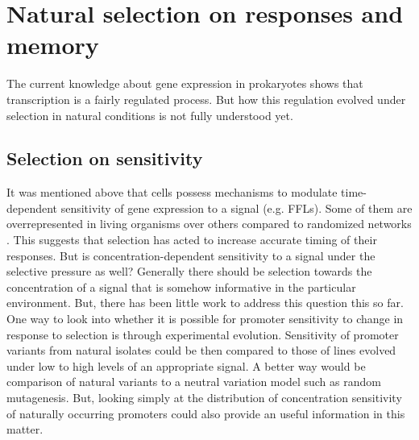 \section{Natural selection on responses and memory}
The current knowledge about gene expression in prokaryotes shows that transcription is a fairly regulated process.
But how this regulation evolved under selection in natural conditions is not fully understood yet.

\subsection{Selection on sensitivity}
It was mentioned above that cells possess mechanisms to modulate time-dependent sensitivity of gene expression to a signal (e.g. FFLs).
Some of them are overrepresented in living organisms over others compared to randomized networks \cite{shen2002network, mangan2003structure}.
This suggests that selection has acted to increase accurate timing of their responses.
But is concentration-dependent sensitivity to a signal under the selective pressure as well?
Generally there should be selection towards the concentration of a signal that is somehow informative in the particular environment.
But, there has been little work to address this question this so far.
One way to look into whether it is possible for promoter sensitivity to change in response to selection is through experimental evolution.
Sensitivity of promoter variants from natural isolates could be then compared to those of lines evolved under low to high levels of an appropriate signal.
A better way would be comparison of natural variants to a neutral variation model such as random mutagenesis.
But, looking simply at the distribution of concentration sensitivity of naturally occurring promoters could also provide an useful information in this matter.

